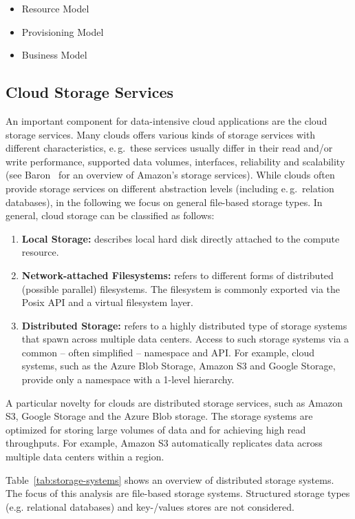 \documentclass[times]{cpeauth}
\begin{document}
\begin{itemize}
	\item Resource Model
	\item Provisioning Model
	\item Business Model
\end{itemize}

\subsection{Cloud Storage Services}

An important component for data-intensive cloud applications are the cloud
storage services. Many clouds offers various kinds of storage services with
different characteristics, e.\,g.\ these services usually differ in their read
and/or write performance, supported data volumes, interfaces, reliability and
scalability (see Baron~\cite{baron2010} for an overview of Amazon's storage
services). While clouds often provide storage services on different 
abstraction levels (including e.\,g.\ relation databases), in the following we 
focus on general file-based storage types. In general, cloud storage can be 
classified as follows:
\begin{enumerate}
	\item \textbf{Local Storage:} describes local hard disk directly attached 
	to the compute resource.
	\item \textbf{Network-attached Filesystems:} refers to different forms of 
	distributed (possible parallel) filesystems. The filesystem is commonly 
	exported via the Posix API and a virtual filesystem layer.
	\item \textbf{Distributed Storage:} refers to a highly distributed type of 
	storage systems that spawn across multiple data centers. Access to such 
	storage systems via a common -- often simplified -- namespace and API. For 
	example, cloud systems, such as the Azure Blob Storage, Amazon S3 and 
	Google Storage, provide only a namespace with a 1-level hierarchy. 
\end{enumerate}

A particular novelty for clouds are distributed storage services, such as
Amazon S3, Google Storage and the Azure Blob storage. The storage systems are
optimized for storing large volumes of data and for achieving high
read throughputs. For example, Amazon S3 automatically replicates data across 
multiple data centers within a region. 


Table~\ref{tab:storage-systems} shows an overview of distributed storage 
systems. The focus of this analysis are file-based storage systems. Structured
storage types (e.g. relational databases) and key-/values stores are not 
considered.
\end{document}
